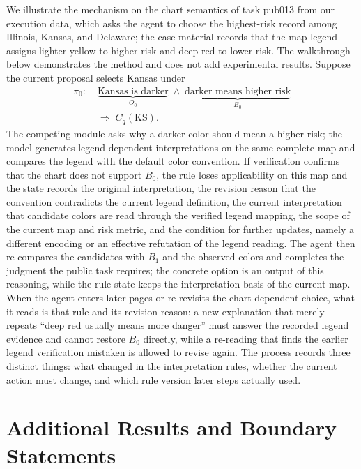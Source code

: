 We illustrate the mechanism on the chart semantics of
task pub013 from our execution data, which asks the
agent to choose the highest-risk record among Illinois,
Kansas, and Delaware; the case material records that the
map legend assigns lighter yellow to higher risk and
deep red to lower risk.
The walkthrough below demonstrates the method and does
not add experimental results.
Suppose the current proposal selects Kansas under
\begin{equation}\label{eq:pub013}
\begin{aligned}
\pi_0:\;
& \underbrace{\text{Kansas is darker}}_{O_0}
\;\land\;
\underbrace{\text{darker means higher risk}}_{B_0} \\
& \Rightarrow\;
C_q(\mathrm{KS}).
\end{aligned}
\end{equation}
The competing module asks why a darker color should mean
a higher risk; the model generates legend-dependent
interpretations on the same complete map and compares
the legend with the default color convention.
If verification confirms that the chart does not support
$B_0$, the rule loses applicability on this map and the
state records the original interpretation, the revision
reason that the convention contradicts the current
legend definition, the current interpretation that
candidate colors are read through the verified legend
mapping, the scope of the current map and risk metric,
and the condition for further updates, namely a
different encoding or an effective refutation of the
legend reading.
The agent then re-compares the candidates with $B_1$ and
the observed colors and completes the judgment the
public task requires; the concrete option is an output
of this reasoning, while the rule state keeps the
interpretation basis of the current map.
When the agent enters later pages or re-revisits the
chart-dependent choice, what it reads is that rule and
its revision reason: a new explanation that merely
repeats ``deep red usually means more danger'' must
answer the recorded legend evidence and cannot restore
$B_0$ directly, while a re-reading that finds the
earlier legend verification mistaken is allowed to
revise again.
The process records three distinct things: what changed
in the interpretation rules, whether the current action
must change, and which rule version later steps actually
used.
\section{Additional Results and Boundary Statements}\label{app:details}


